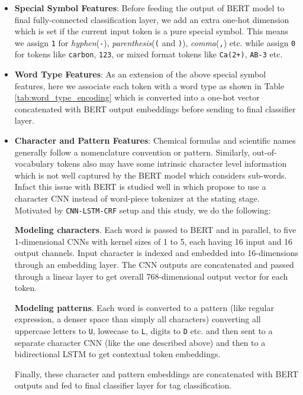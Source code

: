 \begin{itemize}
    \item \textbf{Special Symbol Features}: Before feeding the output of BERT model to final fully-connected classification layer, we add an extra one-hot dimension which is set if the current input token is a pure special symbol. This means we assign \texttt{1} for \textit{hyphen}(\texttt{-}), \textit{parenthesis}(\texttt{(} and \texttt{)}), \textit{comma}(\texttt{,}) etc. while assign \texttt{0} for tokens like \texttt{carbon}, \texttt{123}, or mixed format tokens like \texttt{Ca(2+)}, \texttt{AB-3} etc.
    
    \item \textbf{Word Type Features}: As an extension of the above special symbol features, here we associate each token with a word type as shown in Table \ref{tab:word_type_encoding} which is converted into a one-hot vector concatenated with BERT output embeddings before sending to final classifier layer.
    
    \item \textbf{Character and Pattern Features}: Chemical formulas and scientific names generally follow a nomenclature convention or pattern. Similarly, out-of-vocabulary tokens also may have some intrinsic character level information which is not well captured by the BERT model which considers sub-words. Infact this issue with BERT is studied well in \cite{boukkouri2020characterbert} which propose to use a character CNN instead of word-piece tokenizer at the stating stage. Motivated by \texttt{CNN-LSTM-CRF} setup and this study, we do the following:
    
    \textbf{Modeling characters}. Each word is passed to BERT and in parallel, to five 1-dimensional CNNs with kernel sizes of 1 to 5, each having 16 input and 16 output channels. Input character is indexed and embedded into 16-dimensions through an embedding layer. The CNN outputs are concatenated and passed through a linear layer to get overall 768-dimensional output vector for each token.
    
    \textbf{Modeling patterns}. Each word is converted to a pattern (like regular expression, a denser space than simply all characters) converting all uppercase letters to \texttt{U}, lowecase to \texttt{L}, digits to \texttt{D} etc. and then sent to a separate character CNN (like the one described above) and then to a bidirectional LSTM to get contextual token embeddings.
    
    Finally, these character and pattern embeddings are concatenated with BERT outputs and fed to final classifier layer for tag classification.
    

\end{itemize}

